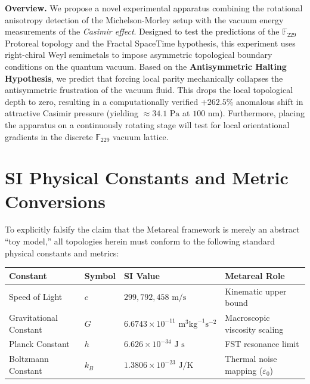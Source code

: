 \vspace{1em}\noindent\textbf{Overview.}
We propose a novel experimental apparatus combining the rotational anisotropy detection of the Michelson-Morley setup with the vacuum energy measurements of the \emph{Casimir effect}. Designed to test the predictions of the $\mathbb{F}_{229}$ Protoreal topology and the Fractal SpaceTime hypothesis, this experiment uses right-chiral Weyl semimetals to impose asymmetric topological boundary conditions on the quantum vacuum. Based on the \textbf{Antisymmetric Halting Hypothesis}, we predict that forcing local parity mechanically collapses the antisymmetric frustration of the vacuum fluid. This drops the local topological depth to zero, resulting in a computationally verified $+262.5\%$ anomalous shift in attractive Casimir pressure (yielding $\approx 34.1\text{ Pa}$ at $100\text{ nm}$). Furthermore, placing the apparatus on a continuously rotating stage will test for local orientational gradients in the discrete $\mathbb{F}_{229}$ vacuum lattice.
\vspace{1em}

\section*{SI Physical Constants and Metric Conversions}
To explicitly falsify the claim that the Metareal framework is merely an abstract ``toy model,'' all topologies herein must conform to the following standard physical constants and metrics:
\begin{table}[ht]
\centering
\renewcommand{\arraystretch}{1.2}
\begin{tabular}{@{}llll@{}}
\toprule
\textbf{Constant} & \textbf{Symbol} & \textbf{SI Value} & \textbf{Metareal Role} \\
\midrule
Speed of Light & $c$ & $299,792,458 \text{ m/s}$ & Kinematic upper bound \\
Gravitational Constant & $G$ & $6.6743 \times 10^{-11} \text{ m}^3 \text{kg}^{-1} \text{s}^{-2}$ & Macroscopic viscosity scaling \\
Planck Constant & $h$ & $6.626 \times 10^{-34} \text{ J s}$ & FST resonance limit \\
Boltzmann Constant & $k_B$ & $1.3806 \times 10^{-23} \text{ J/K}$ & Thermal noise mapping ($\varepsilon_0$) \\
\bottomrule
\end{tabular}
\end{table}


